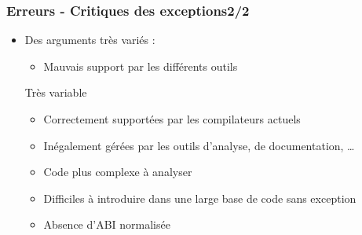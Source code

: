 \documentclass[C++.tex]{subfiles}
\begin{document}
\begin{frame}
	\frametitle{Erreurs - Critiques des exceptions\titlehfill{}2/2}
	\begin{itemize}
		\item Des arguments très variés :
		\begin{itemize}
			\item Mauvais support par les différents outils
		\end{itemize}

		\begin{block}{Très variable}
			\begin{itemize}
				\item Correctement supportées par les compilateurs actuels
				\item Inégalement gérées par les outils d'analyse, de documentation, \ldots
			\end{itemize}
		\end{block}

		\begin{itemize}
			\item Code plus complexe à analyser
			\item Difficiles à introduire dans une large base de code sans exception


			\item Absence d'ABI normalisée

		\end{itemize}
	\end{itemize}
\end{frame}
\end{document}
